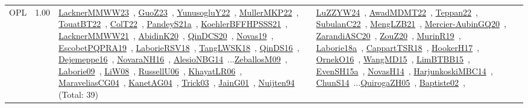 {\begin{longtable}{p{3cm}r>{\raggedright\arraybackslash}p{6cm}>{\raggedright\arraybackslash}p{6cm}>{\raggedright\arraybackslash}p{8cm}}
\index{OPL}\index{CPSystems!OPL}OPL &  1.00 & \href{../works/LacknerMMWW23.pdf}{LacknerMMWW23}~\cite{LacknerMMWW23}, \href{../works/GuoZ23.pdf}{GuoZ23}~\cite{GuoZ23}, \href{../works/YunusogluY22.pdf}{YunusogluY22}~\cite{YunusogluY22}, \href{../works/MullerMKP22.pdf}{MullerMKP22}~\cite{MullerMKP22}, \href{../works/TouatBT22.pdf}{TouatBT22}~\cite{TouatBT22}, \href{../works/ColT22.pdf}{ColT22}~\cite{ColT22}, \href{../works/PandeyS21a.pdf}{PandeyS21a}~\cite{PandeyS21a}, \href{../works/KoehlerBFFHPSSS21.pdf}{KoehlerBFFHPSSS21}~\cite{KoehlerBFFHPSSS21}, \href{../works/LacknerMMWW21.pdf}{LacknerMMWW21}~\cite{LacknerMMWW21}, \href{../works/AbidinK20.pdf}{AbidinK20}~\cite{AbidinK20}, \href{../works/QinDCS20.pdf}{QinDCS20}~\cite{QinDCS20}, \href{../works/Novas19.pdf}{Novas19}~\cite{Novas19}, \href{../works/EscobetPQPRA19.pdf}{EscobetPQPRA19}~\cite{EscobetPQPRA19}, \href{../works/LaborieRSV18.pdf}{LaborieRSV18}~\cite{LaborieRSV18}, \href{../works/TangLWSK18.pdf}{TangLWSK18}~\cite{TangLWSK18}, \href{../works/QinDS16.pdf}{QinDS16}~\cite{QinDS16}, \href{../works/Dejemeppe16.pdf}{Dejemeppe16}~\cite{Dejemeppe16}, \href{../works/NovaraNH16.pdf}{NovaraNH16}~\cite{NovaraNH16}, \href{../works/AlesioNBG14.pdf}{AlesioNBG14}~\cite{AlesioNBG14}...\href{../works/ZeballosM09.pdf}{ZeballosM09}~\cite{ZeballosM09}, \href{../works/Laborie09.pdf}{Laborie09}~\cite{Laborie09}, \href{../works/LiW08.pdf}{LiW08}~\cite{LiW08}, \href{../works/RussellU06.pdf}{RussellU06}~\cite{RussellU06}, \href{../works/KhayatLR06.pdf}{KhayatLR06}~\cite{KhayatLR06}, \href{../works/MaraveliasCG04.pdf}{MaraveliasCG04}~\cite{MaraveliasCG04}, \href{../works/KanetAG04.pdf}{KanetAG04}~\cite{KanetAG04}, \href{../works/Trick03.pdf}{Trick03}~\cite{Trick03}, \href{../works/JainG01.pdf}{JainG01}~\cite{JainG01}, \href{../works/Nuijten94.pdf}{Nuijten94}~\cite{Nuijten94} (Total: 39) & \href{../works/LuZZYW24.pdf}{LuZZYW24}~\cite{LuZZYW24}, \href{../works/AwadMDMT22.pdf}{AwadMDMT22}~\cite{AwadMDMT22}, \href{../works/Teppan22.pdf}{Teppan22}~\cite{Teppan22}, \href{../works/SubulanC22.pdf}{SubulanC22}~\cite{SubulanC22}, \href{../works/MengLZB21.pdf}{MengLZB21}~\cite{MengLZB21}, \href{../works/Mercier-AubinGQ20.pdf}{Mercier-AubinGQ20}~\cite{Mercier-AubinGQ20}, \href{../works/ZarandiASC20.pdf}{ZarandiASC20}~\cite{ZarandiASC20}, \href{../works/ZouZ20.pdf}{ZouZ20}~\cite{ZouZ20}, \href{../works/MurinR19.pdf}{MurinR19}~\cite{MurinR19}, \href{../works/Laborie18a.pdf}{Laborie18a}~\cite{Laborie18a}, \href{../works/CappartTSR18.pdf}{CappartTSR18}~\cite{CappartTSR18}, \href{../works/HookerH17.pdf}{HookerH17}~\cite{HookerH17}, \href{../works/OrnekO16.pdf}{OrnekO16}~\cite{OrnekO16}, \href{../works/WangMD15.pdf}{WangMD15}~\cite{WangMD15}, \href{../works/LimBTBB15.pdf}{LimBTBB15}~\cite{LimBTBB15}, \href{../works/EvenSH15a.pdf}{EvenSH15a}~\cite{EvenSH15a}, \href{../works/NovasH14.pdf}{NovasH14}~\cite{NovasH14}, \href{../works/HarjunkoskiMBC14.pdf}{HarjunkoskiMBC14}~\cite{HarjunkoskiMBC14}, \href{../works/ChunS14.pdf}{ChunS14}~\cite{ChunS14}...\href{../works/QuirogaZH05.pdf}{QuirogaZH05}~\cite{QuirogaZH05}, \href{../works/Baptiste02.pdf}{Baptiste02}~\cite{Baptiste02}, 
\end{longtable}}
